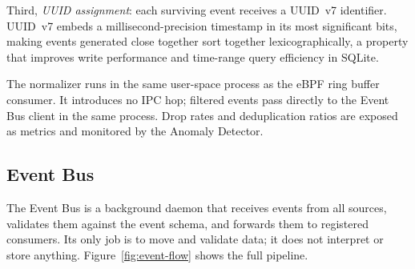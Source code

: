 Third, \emph{UUID assignment}: each surviving event receives a UUID~v7
identifier. UUID~v7 embeds a millisecond-precision timestamp in its most
significant bits, making events generated close together sort together
lexicographically, a property that improves write performance and
time-range query efficiency in SQLite.

The normalizer runs in the same user-space process as the eBPF ring buffer
consumer. It introduces no IPC hop; filtered events pass directly to the
Event Bus client in the same process. Drop rates and deduplication ratios
are exposed as metrics and monitored by the Anomaly Detector.

\subsection{Event Bus}
\label{sec:event-bus}

The Event Bus is a background daemon that receives events from all sources,
validates them against the event schema, and forwards them to registered
consumers. Its only job is to move and validate data; it does not interpret or
store anything. Figure~\ref{fig:event-flow} shows the full pipeline.

